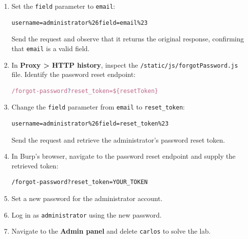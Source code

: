 \documentclass[11pt,a4paper]{article}
\begin{document}
\begin{enumerate}
          \begin{enumerate}
              \item Right-click the request and select \textbf{Send to Intruder}.
              \item Set the payload position around the field value:
                    \begin{lstlisting}
username=administrator%26field=<PAYLOAD>%23
        \end{lstlisting}
              \item Under \textbf{Payload configuration}, select \textbf{Add from list}.
              \item Choose the built-in \textbf{Server-side variable names} payload list.
              \item Start the attack and review the results. Notice that the \texttt{username} and \texttt{email} payloads return HTTP \texttt{200} responses.
          \end{enumerate}
          \newpage
    \item Set the \texttt{field} parameter to \texttt{email}:
          \begin{lstlisting}
username=administrator%26field=email%23
    \end{lstlisting}
          Send the request and observe that it returns the original response, confirming that \texttt{email} is a valid field.
    \item In \textbf{Proxy > HTTP history}, inspect the \texttt{/static/js/forgotPassword.js} file. Identify the password reset endpoint:
          \begin{lstlisting}[language=JavaScript]
/forgot-password?reset_token=${resetToken}
    \end{lstlisting}
    \item Change the \texttt{field} parameter from \texttt{email} to \texttt{reset\_token}:
          \begin{lstlisting}
username=administrator%26field=reset_token%23
    \end{lstlisting}
          Send the request and retrieve the administrator's password reset token.
    \item In Burp's browser, navigate to the password reset endpoint and supply the retrieved token:
          \begin{lstlisting}
/forgot-password?reset_token=YOUR_TOKEN
    \end{lstlisting}
    \item Set a new password for the administrator account.
    \item Log in as \texttt{administrator} using the new password.
    \item Navigate to the \textbf{Admin panel} and delete \texttt{carlos} to solve the lab.
\end{enumerate}
\end{document}
